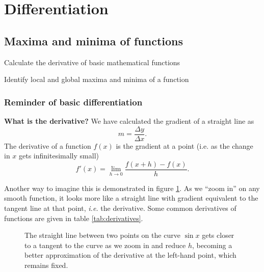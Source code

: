 \setcounter{section}{1}
\section{Differentiation}

\begin{ILOssec}
    \item \ILOc
\end{ILOssec}

\subsection{Maxima and minima of functions}
\label{sec:min_max}

\begin{learningoutcomes}
\item Calculate the derivative of basic mathematical functions
\item Identify local and global maxima and minima of a function
\end{learningoutcomes}

\subsubsection{Reminder of basic differentiation}
\textbf{What is the derivative?} We have calculated the gradient of a straight line as
\[
m=\frac{\Delta y}{\Delta x}.
\]
The derivative of a function $f(x)$ is the gradient at a point (i.e. as the change in $x$ gets infinitesimally small)
\begin{equation}
    f'(x)=\lim_{h\to0}\frac{f(x+h)-f(x)}{h}.
\end{equation}


Another way to imagine this is demonstrated in figure \ref{fig:diff_zoom}. As we ``zoom in'' on any smooth function, it looks more like a straight line with gradient equivalent to the tangent line at that point, \textit{i.e.} the derivative. Some common derivatives of functions are given in table \ref{tab:derivatives}. 
 
\begin{figure}[ht]
    \centering
    \iflatexml
    \else
    \fi
    \caption{The straight line between two points on the curve $\sin x$ gets closer to a tangent to the curve as we zoom in and reduce $h$, becoming a better approximation of the derivative at the left-hand point, which remains fixed.}
    \label{fig:diff_zoom}
\end{figure}

